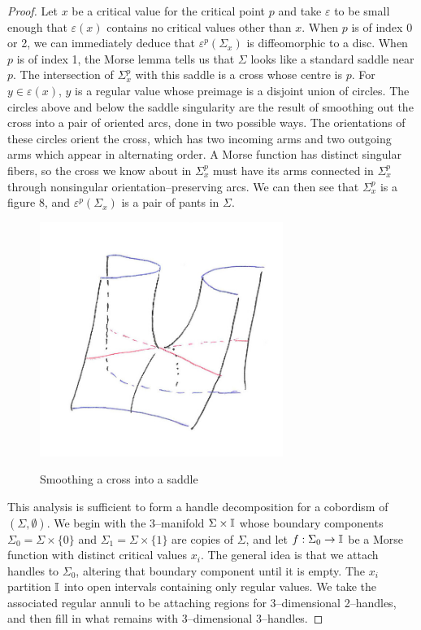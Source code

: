 \begin{proof}
	Let $x$ be a critical value for the critical point $p$ and take $\varepsilon$ to be small enough that $\varepsilon(x)$ contains no critical values other than $x$.
	When $p$ is of index 0 or 2, we can immediately deduce that $\varepsilon^p(\Sigma_x)$ is diffeomorphic to a disc.
	When $p$ is of index 1, the Morse lemma tells us that $\Sigma$ looks like a standard saddle near $p$.
	The intersection of $\Sigma_x^p$ with this saddle is a cross whose centre is $p$.
	For $y\in\varepsilon(x)$, $y$ is a regular value whose preimage is a disjoint union of circles.
	The circles above and below the saddle singularity are the result of smoothing out the cross into a pair of oriented arcs, done in two possible ways.
	The orientations of these circles orient the cross, which has two incoming arms and two outgoing arms which appear in alternating order.
	A Morse function has distinct singular fibers, so the cross we know about in $\Sigma_x^p$ must have its arms connected in $\Sigma_x^p$ through nonsingular orientation--preserving arcs.
	We can then see that $\Sigma_x^p$ is a figure 8, and $\varepsilon^p(\Sigma_x)$ is a pair of pants in $\Sigma$.
	

	\begin{figure}
		\centering
		\caption{Smoothing a cross into a saddle}
		\includegraphics[height=3in]{figures/smoothcross.jpg}
		\label{fig:smoothcross}
	\end{figure}
	
	This analysis is sufficient to form a handle decomposition for a cobordism of $(\Sigma,\emptyset)$.
	We begin with the 3--manifold $\Sigma\times\mathbb{I}$ whose boundary components $\Sigma_0=\Sigma\times\{0\}$ and $\Sigma_1=\Sigma\times\{1\}$ are copies of $\Sigma$, and let $f:\Sigma_0\to\mathbb{I}$ be a Morse function with distinct critical values $x_i$.
	The general idea is that we attach handles to $\Sigma_0$, altering that boundary component until it is empty.
	The $x_i$ partition $\mathbb{I}$ into open intervals containing only regular values.
	We take the associated regular annuli to be attaching regions for 3--dimensional 2--handles, and then fill in what remains with 3--dimensional 3--handles.
	

\end{proof}
